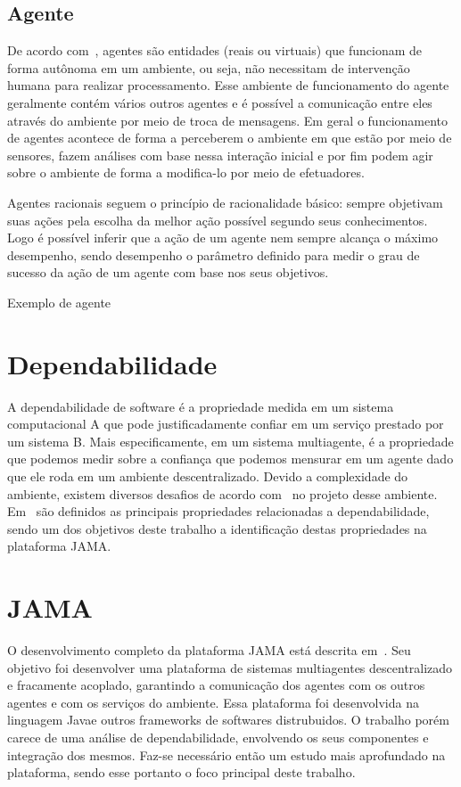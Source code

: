 \subsection{Agente}

De acordo com~\cite{wooldridge95}, agentes são entidades (reais ou virtuais) que funcionam de forma autônoma em um ambiente, ou seja, não necessitam de intervenção humana para realizar processamento. Esse ambiente de funcionamento do agente geralmente contém vários outros agentes e é possível a comunicação entre eles através do ambiente por meio de troca de mensagens. Em geral o funcionamento de agentes acontece de forma a perceberem o ambiente em que estão por meio de sensores, fazem análises com base nessa interação inicial e por fim podem agir sobre o ambiente de forma a modifica-lo por meio de efetuadores.

Agentes racionais seguem o princípio de racionalidade básico: sempre objetivam suas ações pela escolha da melhor ação possível segundo seus conhecimentos. Logo é possível inferir que a ação de um agente nem sempre alcança o máximo desempenho, sendo desempenho o parâmetro definido para medir o grau de sucesso da ação de um agente com base nos seus objetivos.

Exemplo de agente

\section{Dependabilidade}

A dependabilidade de software é a propriedade medida em um sistema computacional A que pode justificadamente confiar em um serviço prestado por um sistema B. Mais especificamente,
em um sistema multiagente, é a propriedade que podemos medir sobre a confiança que podemos mensurar em um agente dado que ele roda em um ambiente descentralizado. Devido a complexidade
do ambiente, existem diversos desafios de acordo com~\cite{hoffman08} no projeto desse ambiente. Em~\cite{algirdas04} são definidos as principais propriedades relacionadas
a dependabilidade, sendo um dos objetivos deste trabalho a identificação destas propriedades na plataforma JAMA.

\section{JAMA}

O desenvolvimento completo da plataforma JAMA está descrita em~\cite{parise11}. Seu objetivo foi desenvolver uma plataforma de sistemas multiagentes descentralizado
e fracamente acoplado, garantindo a comunicação dos agentes com os outros agentes e com os serviços do ambiente. Essa plataforma foi desenvolvida na linguagem Javae outros
frameworks de softwares distrubuidos. O trabalho porém carece de uma análise de dependabilidade, envolvendo os seus componentes e integração dos mesmos. Faz-se necessário
então um estudo mais aprofundado na plataforma, sendo esse portanto o foco principal deste trabalho.




